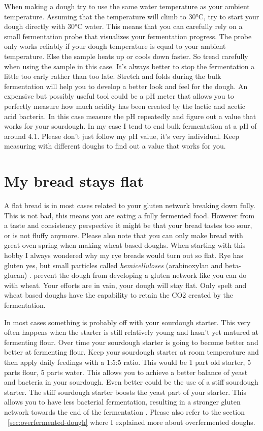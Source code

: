 When making a dough try to use the same water temperature
as your ambient temperature. Assuming that the temperature
will climb to 30°C, try to start your dough directly
with 30°C water. This means that you can carefully rely on
a small fermentation probe that visualizes your fermentation
progress. The probe only works reliably if your dough temperature
is equal to your ambient temperature. Else the sample heats
up or cools down faster. So tread carefully when using
the sample in this case. It's always better to stop
the fermentation a little too early rather than too late.
Stretch and folds during the bulk fermentation
will help you to develop a better look and feel for
the dough. An expensive but possibly useful tool
could be a pH meter that allows you to perfectly
measure how much acidity has been created by the
lactic and acetic acid bacteria. In this case measure
the pH repeatedly and figure out a value that works
for your sourdough. In my case I tend to end bulk
fermentation at a pH of around 4.1. Please don't just
follow my pH value, it's very individual. Keep measuring
with different doughs to find out a value that works for you.

\section{My bread stays flat}

A flat bread is in most cases related to your gluten
network breaking down fully. This is not bad, this
means you are eating a fully fermented food. However
from a taste and consistency perspective it might be
that your bread tastes too sour, or is not fluffy anymore.
Please also note that you can only make bread with
great oven spring when making wheat based doughs. When
starting with this hobby I always wondered why my rye
breads would turn out so flat. Rye has gluten yes, but
small particles called {\it hemicelluloses} (arabinoxylan and beta-glucan) \cite{rye-defects}.
prevent the dough from developing a gluten network like you can
do with wheat. Your efforts are in vain, your dough will
stay flat. Only spelt and wheat based doughs have the capability
to retain the CO2 created by the fermentation.

In most cases something is probably off with your
sourdough starter. This very often happens when the starter
is still relatively young and hasn't yet matured
at fermenting flour. Over time your sourdough
starter is going to become better and better at fermenting
flour. Keep your sourdough starter at room temperature
and then apply daily feedings with a 1:5:5 ratio.
This would be 1 part old starter, 5 parts flour,
5 parts water. This allows you to achieve a better
balance of yeast and bacteria in your sourdough.
Even better could be the use of a stiff sourdough
starter. The stiff sourdough starter boosts
the yeast part of your starter. This allows you
to have less bacterial fermentation, resulting
in a stronger gluten network towards the end
of the fermentation \cite{stiff+starter}. Please
also refer to the section ~\ref{sec:overfermented-dough} where
I explained more about overfermented doughs.

